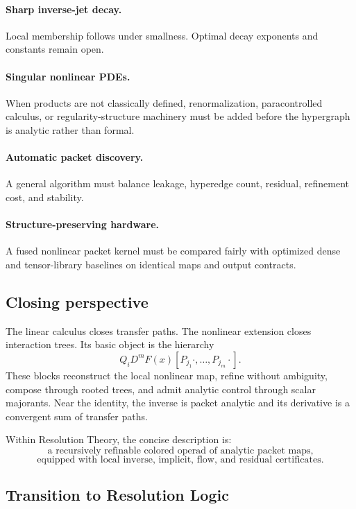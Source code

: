 \documentclass[11pt]{article}
\theoremstyle{definition}
\theoremstyle{remark}
\begin{document}
\paragraph{Sharp inverse-jet decay.}
Local membership follows under smallness.  Optimal decay exponents and constants remain open.

\paragraph{Singular nonlinear PDEs.}
When products are not classically defined, renormalization, paracontrolled calculus, or regularity-structure machinery must be added before the hypergraph is analytic rather than formal.

\paragraph{Automatic packet discovery.}
A general algorithm must balance leakage, hyperedge count, residual, refinement cost, and stability.

\paragraph{Structure-preserving hardware.}
A fused nonlinear packet kernel must be compared fairly with optimized dense and tensor-library baselines on identical maps and output contracts.

\subsection{Closing perspective}

The linear calculus closes transfer paths.  The nonlinear extension closes interaction trees.  Its basic object is the hierarchy
\[
Q_iD^mF(x)
\left[P_{j_1}\cdot,\ldots,P_{j_m}\cdot\right].
\]
These blocks reconstruct the local nonlinear map, refine without ambiguity, compose through rooted trees, and admit analytic control through scalar majorants.  Near the identity, the inverse is packet analytic and its derivative is a convergent sum of transfer paths.

Within Resolution Theory, the concise description is:
\[
\boxed{
\text{a recursively refinable colored operad of analytic packet maps,}
}
\]
\[
\boxed{
\text{equipped with local inverse, implicit, flow, and residual certificates.}
}
\]



\subsection{Transition to Resolution Logic}
\end{document}
